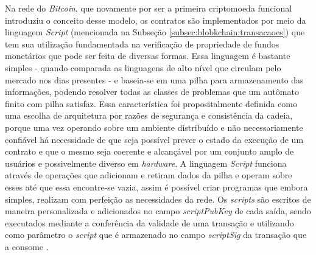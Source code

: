 Na rede do \textit{Bitcoin}, que novamente por ser a primeira criptomoeda funcional introduziu o conceito desse modelo, os contratos são implementados por meio da linguagem \textit{Script} (mencionada na Subseção \ref{subsec:blobkchain:transacaoes}) que tem sua utilização fundamentada na verificação de propriedade de fundos monetários que pode ser feita de diversas formas. Essa linguagem é bastante simples - quando comparada as linguagens de alto nível que circulam pelo mercado nos dias presentes - e baseia-se em uma pilha para armazenamento das informações, podendo resolver todas as classes de problemas que um autômato finito com pilha satisfaz. Essa característica foi propositalmente definida como uma escolha de arquitetura por razões de segurança e consistência da cadeia, porque uma vez operando sobre um ambiente distribuído e não necessariamente confiável há necessidade de que seja possível prever o estado da execução de um contrato e que o mesmo seja coerente e alcançável por um conjunto amplo de usuários e possivelmente diverso em \textit{hardware}. A linguagem \textit{Script} funciona através de operações que adicionam e retiram dados da pilha e operam sobre esses até que essa encontre-se vazia, assim é possível criar programas que embora simples, realizam com perfeição as necessidades da rede. Os \textit{scripts} são escritos de maneira personalizada e adicionados no campo \textit{scriptPubKey} de cada saída, sendo executados mediante a conferência da validade de uma transação e utilizando como parâmetro o \textit{script} que é armazenado no campo \textit{scriptSig} da transação que a consome \cite{blockchain:documentacao_bitcoin}.

